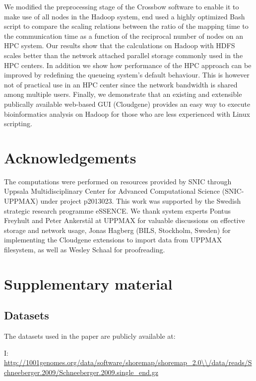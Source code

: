 \documentclass[11pt, oneside]{article}   	%
\begin{document}
We modified the preprocessing stage of the Crossbow software to enable it to make use of all nodes in the Hadoop system, end used a highly optimized Bash script to compare the scaling relations between the ratio of the mapping time to the communication time as a function of the reciprocal number of nodes on an HPC system. 
Our results show that the calculations on Hadoop with HDFS scales better than the network attached parallel storage commonly used in the HPC centers.
In addition we show how performance of the HPC approach can be improved by redefining the queueing system's default behaviour. This is however not of practical use in an HPC center since the network bandwidth is shared among multiple users. Finally, we demonstrate that an existing and extensible publically available web-based GUI (Cloudgene) provides an easy way to execute bioinformatics analysis on Hadoop for those who are less experienced with Linux scripting.



\section{Acknowledgements}
The computations were performed on resources provided by SNIC through Uppsala Multidisciplinary Center for Advanced Computational Science (SNIC-UPPMAX) under project p2013023. This work was supported by the Swedish strategic research programme eSSENCE.
We thank system experts Pontus Freyhult and Peter Ankerst{\aa}l at UPPMAX for valuable discussions on effective storage and network usage, Jonas Hagberg (BILS, Stockholm, Sweden) for implementing the Cloudgene extensions to import data from UPPMAX filesystem, as well as Wesley Schaal for proofreading.



\section{Supplementary material}

\subsection{Datasets}

The datasets used in the paper are publicly available at:

I: \url{http://1001genomes.org/data/software/shoremap/shoremap\_2.0\\/data/reads/Schneeberger.2009/Schneeberger.2009.single\_end.gz}
\end{document}
